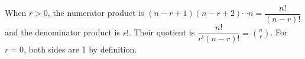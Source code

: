 When $r>0$, the numerator product is $(n-r+1)(n-r+2)\cdots n=\dfrac{n!}{(n-r)!}$ and the denominator product is $r!$. Their quotient is $\dfrac{n!}{r!(n-r)!}=\binom nr$. For $r=0$, both sides are 1 by definition.
